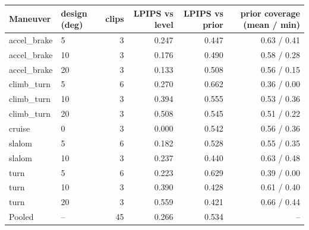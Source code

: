 \footnotesize
\begin{tabular}{llrrrr}
\toprule
Maneuver & design (deg) & clips & LPIPS vs level & LPIPS vs prior & prior coverage (mean / min) \\
\midrule
accel\_brake & 5 & 3 & 0.247 & 0.447 & 0.63 / 0.41 \\
accel\_brake & 10 & 3 & 0.176 & 0.490 & 0.58 / 0.28 \\
accel\_brake & 20 & 3 & 0.133 & 0.508 & 0.56 / 0.15 \\
climb\_turn & 5 & 6 & 0.270 & 0.662 & 0.36 / 0.00 \\
climb\_turn & 10 & 3 & 0.394 & 0.555 & 0.53 / 0.36 \\
climb\_turn & 20 & 3 & 0.508 & 0.545 & 0.51 / 0.22 \\
cruise & 0 & 3 & 0.000 & 0.542 & 0.56 / 0.36 \\
slalom & 5 & 6 & 0.182 & 0.528 & 0.55 / 0.35 \\
slalom & 10 & 3 & 0.237 & 0.440 & 0.63 / 0.48 \\
turn & 5 & 6 & 0.223 & 0.629 & 0.39 / 0.00 \\
turn & 10 & 3 & 0.390 & 0.428 & 0.61 / 0.40 \\
turn & 20 & 3 & 0.559 & 0.421 & 0.66 / 0.44 \\
\midrule
Pooled & -- & 45 & 0.266 & 0.534 & -- \\
\bottomrule
\end{tabular}

